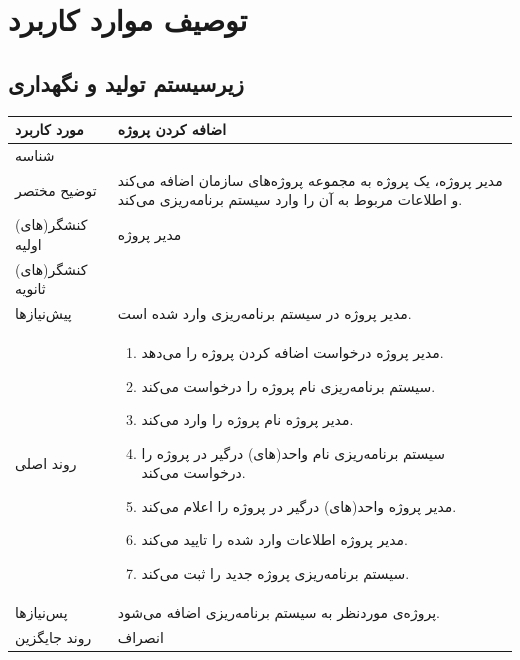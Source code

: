 \newpage
\section{توصیف موارد کاربرد}
\subsection{زیرسیستم تولید و نگهداری}

\begin{table}[H]
	\centering
	\begin{tabular}{|p{3cm}|p{10cm}|}
		\hline
		
		
		مورد کاربرد	& اضافه کردن پروژه  \\
		\hline
		
		شناسه & 
		\stepcounter{usecase_ID}
		
		\arabic{usecase_ID} \\
		
		\hline
		
		توضیح مختصر & مدیر پروژه، یک پروژه به مجموعه پروژه‌های سازمان اضافه می‌کند و اطلاعات مربوط به آن را وارد سیستم برنامه‌ریزی می‌کند. \\
		\hline
		
		کنشگر(های) اولیه & مدیر پروژه \\
		\hline
		
		کنشگر(های) ثانویه&  \\
		\hline
		
		پیش‌نیازها &
		مدیر پروژه در سیستم برنامه‌ریزی وارد شده است.\\
		\hline
		
		
		روند اصلی &
		\begin{enumerate}[topsep=0cm,leftmargin=0.5cm]
			\item مدیر پروژه درخواست اضافه کردن پروژه را می‌دهد.
			\item سیستم برنامه‌ریزی نام پروژه را درخواست می‌کند.
			\item مدیر پروژه نام پروژه را وارد می‌کند. 
			\item سیستم برنامه‌ریزی نام واحد(های) درگیر در پروژه را درخواست می‌کند. 
			\item مدیر پروژه واحد(های) درگیر در پروژه را اعلام می‌کند. 
			\item  مدیر پروژه اطلاعات وارد شده را تایید می‌کند. 
			\item سیستم برنامه‌ریزی پروژه جدید را ثبت می‌کند.
		\end{enumerate} \\
		
		\hline
		
		پس‌نیازها &
		پروژه‌ی موردنظر به سیستم برنامه‌ریزی اضافه می‌شود. \\
		\hline
		
		روند جایگزین & انصراف \\
		\hline
		
	\end{tabular}
\end{table}


